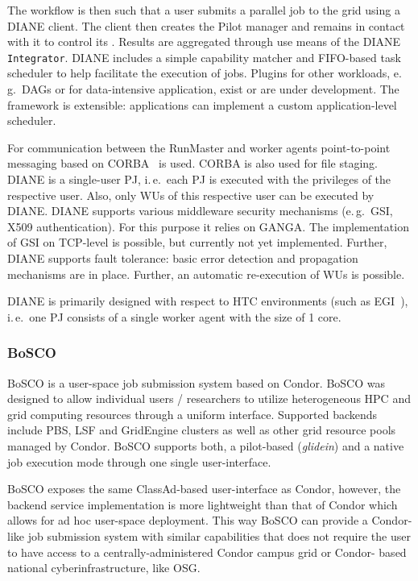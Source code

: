 \documentclass{sig-alternate}
\begin{document}
The workflow is then such that a user submits a parallel job to
the grid using a DIANE client.  The client then creates the Pilot manager
and remains in contact with it to control its \pilotjobs.  Results
are aggregated through use means of the DIANE
\texttt{Integrator}.
DIANE includes a simple capability matcher and FIFO-based task scheduler
to help facilitate the execution of jobs.
Plugins for other workloads, e.\,g.\ DAGs or for data-intensive
application, exist or are under development. The framework is extensible:
applications can implement a custom application-level scheduler.

For communication between the RunMaster and
worker agents point-to-point messaging based on CORBA~\cite{OMG-CORBA303:2004}
is used. CORBA is also used for file staging.
DIANE is a single-user PJ, i.\,e.\ each PJ is executed with the
privileges of the respective user. Also, only WUs of this respective user can be
executed by DIANE. DIANE supports various middleware security mechanisms
(e.\,g.\ GSI, X509 authentication). For this purpose it relies on GANGA. The
implementation of GSI on TCP-level is possible, but currently not yet
implemented. Further, DIANE supports fault tolerance: basic error detection and
propagation mechanisms are in place. Further, an automatic re-execution of WUs
is possible.

DIANE is primarily designed with respect to HTC environments (such as
EGI~\cite{egi}), i.\,e.\ one PJ consists of a single worker agent with the
size of 1 core.

%
\subsubsection{BoSCO}

BoSCO is a user-space job submission system based on Condor. BoSCO was designed
to allow individual users / researchers to utilize heterogeneous HPC and grid
computing resources through a uniform interface. Supported backends include PBS,
LSF and GridEngine clusters as well as other  grid resource pools managed by
Condor. BoSCO supports both, a pilot-based (\textit{glidein}) and a native job
execution mode through one single user-interface.

BoSCO exposes the same ClassAd-based user-interface as Condor, however, the
backend service implementation is more lightweight than that of Condor which
allows  for ad hoc user-space deployment. This way BoSCO can provide a Condor-
like job submission system with similar capabilities that does not require the
user to have access to a centrally-administered Condor campus grid or  Condor-
based national cyberinfrastructure, like OSG.
\end{document}
